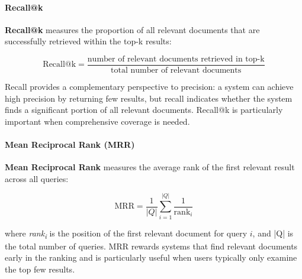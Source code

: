 \paragraph{Recall@k}

\textbf{Recall@k} measures the proportion of all relevant documents that are
successfully retrieved within the top-k results:

\[
  \text{Recall@k} = \frac{\text{number of relevant documents
  retrieved in top-k}}{\text{total number of relevant documents}}
\]

Recall provides a complementary perspective to precision: a system can achieve
high precision by returning few results, but recall indicates whether the system
finds a significant portion of all relevant documents. Recall@k is particularly
important when comprehensive coverage is needed.

\paragraph{Mean Reciprocal Rank (MRR)}

\textbf{Mean Reciprocal Rank} measures the average rank of the first relevant
result across all queries:

\[
  \text{MRR} = \frac{1}{|Q|} \sum_{i=1}^{|Q|} \frac{1}{\text{rank}_i}
\]

where \textsl{rank\textsubscript{i}} is the position of the first relevant
document for query $i$, and |Q| is the total number of queries. MRR rewards
systems that find relevant documents early in the ranking and is particularly
useful when users typically only examine the top few results.

%
%
%
%
%
%
%

